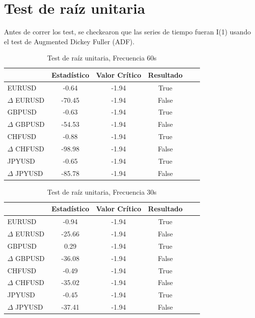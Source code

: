 \section{Test de raíz unitaria}
Antes de correr los test, se checkearon que las series de tiempo fueran
I(1) usando el test de Augmented Dickey Fuller (ADF).

\begin{table}[h!]
\caption{Test de raíz unitaria, Frecuencia 60s}
\label{tab:adf_60s}
\begin{center}
\begin{tabular}{|l|c|c|c|c|c|}
\hline
& \textbf{Estadístico} & \textbf{Valor Crítico} & \textbf{Resultado}\\
\hline
EURUSD          & -0.64 & -1.94 & True       \\
$\Delta$ EURUSD & -70.45   & -1.94 & False       \\
GBPUSD          & -0.63   & -1.94 & True          \\
$\Delta$ GBPUSD & -54.53   & -1.94 & False       \\
CHFUSD          & -0.88   & -1.94 & True         \\
$\Delta$ CHFUSD & -98.98   & -1.94 & False       \\
JPYUSD          & -0.65 & -1.94 & True        \\
$\Delta$ JPYUSD & -85.78 & -1.94 & False     \\ 
\hline
\end{tabular}
\end{center}
\end{table}

\begin{table}[h!]
\caption{Test de raíz unitaria, Frecuencia 30s}
\label{tab:adf_30s}
\begin{center}
\begin{tabular}{|l|c|c|c|c|c|}
\hline
& \textbf{Estadístico} & \textbf{Valor Crítico} & \textbf{Resultado}\\
\hline
EURUSD          & -0.94 & -1.94 & True       \\
$\Delta$ EURUSD & -25.66   & -1.94 & False       \\
GBPUSD          & 0.29   & -1.94 & True          \\
$\Delta$ GBPUSD & -36.08   & -1.94 & False       \\
CHFUSD          & -0.49   & -1.94 & True         \\
$\Delta$ CHFUSD & -35.02   & -1.94 & False       \\
JPYUSD          & -0.45 & -1.94 & True        \\
$\Delta$ JPYUSD & -37.41 & -1.94 & False     \\ 
\hline
\end{tabular}
\end{center}
\end{table}

